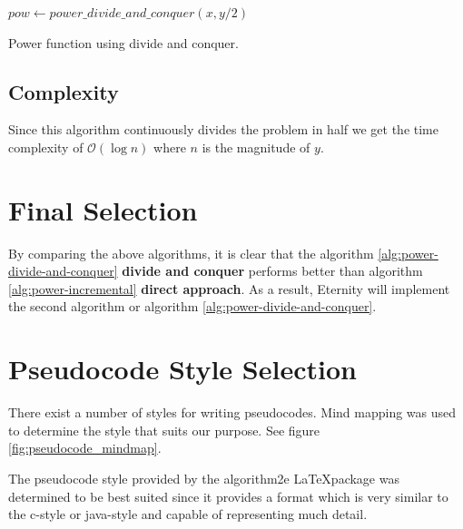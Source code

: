 \documentclass[11pt,a4paper]{report}
\theoremstyle{definition}
\theoremstyle{remark}
\begin{document}
            	\begin{algorithm}
                        
                        $pow \gets power\_divide\_and\_conquer(x, y / 2)$\;
                        
                \caption{Power function using divide and conquer.}
                \label{alg:power-divide-and-conquer}
            	\end{algorithm}
            
            \subsection{Complexity}
                Since this algorithm continuously divides the problem in half we get the time complexity of $\mathcal{O}(\log n)$ where $n$ is the magnitude of $y$.
            
        
        \section{Final Selection}
            By comparing the above algorithms, it is clear that the algorithm \ref{alg:power-divide-and-conquer} \textbf{divide and conquer} performs better than algorithm \ref{alg:power-incremental} \textbf{direct approach}. As a result, Eternity will implement the second algorithm or algorithm \ref{alg:power-divide-and-conquer}.
        
        \clearpage
        
        \section{Pseudocode Style Selection}
            There exist a number of styles for writing pseudocodes. Mind mapping was used to determine the style that suits our purpose. See figure \ref{fig:pseudocode_mindmap}.
            
            The pseudocode style provided by the algorithm2e \LaTeX package was determined to be best suited since it provides a format which is very similar to the c-style or java-style and capable of representing much detail.
            
\end{document}
